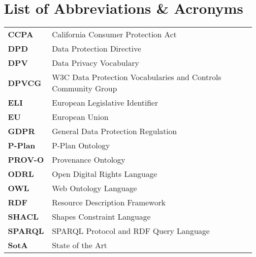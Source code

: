 \thispagestyle{empty}
\chapter*{List of Abbreviations \& Acronyms}
\begin{table}[htbp]
    \centering
    \begin{tabular}{>{\bfseries}l|l}
        CCPA & California Consumer Protection Act \\
        DPD & Data Protection Directive \\
        DPV & Data Privacy Vocabulary \\
        DPVCG & W3C Data Protection Vocabularies and Controls Community Group \\
        ELI & European Legislative Identifier \\
        EU & European Union \\
        GDPR & General Data Protection Regulation \\
        P-Plan & P-Plan Ontology \\
        PROV-O & Provenance Ontology \\
        ODRL & Open Digital Rights Language \\ 
        OWL & Web Ontology Language \\
        RDF & Resource Description Framework \\
        SHACL & Shapes Constraint Language \\
        SPARQL & SPARQL Protocol and RDF Query Language \\
        SotA & State of the Art \\
    \end{tabular}
\end{table}